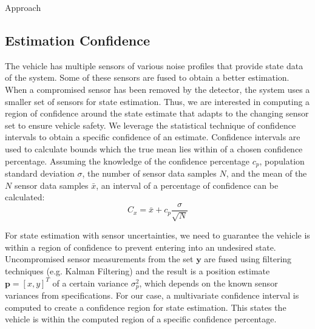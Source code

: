 \begin{section}{Approach}
\subsection{Estimation Confidence}

The vehicle has multiple sensors of various noise profiles that provide state data of the system. Some of these sensors are fused to obtain a better estimation. When a compromised sensor has been removed by the detector, the system uses a smaller set of sensors for state estimation. Thus, we are interested in computing a region of confidence around the state estimate that adapts to the changing sensor set to ensure vehicle safety. We leverage the statistical technique of confidence intervals \cite{devore2011probability} to obtain a specific confidence of an estimate. Confidence intervals are used to calculate bounds which the true mean lies within of a chosen confidence percentage. Assuming the knowledge of the confidence percentage $c_p$, population standard deviation $\sigma$, the number of sensor data samples $N$, and the mean of the $N$ sensor data samples $\bar{x}$, an interval of a percentage of confidence can be calculated:
    \begin{equation}
     \label{Confidence_interval}
		C_x = \bar{x} + c_p\frac{\sigma}{\sqrt{N}}
	\end{equation}
	
	
For state estimation with sensor uncertainties, we need to guarantee the vehicle is within a region of confidence to prevent entering into an undesired state. Uncompromised sensor measurements from the set $\bm{y}$ are fused using filtering techniques (e.g. Kalman Filtering) and the result is a position estimate $\bm{p}=[x,y]^T$ of a certain variance $\sigma_p^2$, which depends on the known sensor variances from specifications. For our case, a multivariate confidence interval is computed to create a confidence region for state estimation. This states the vehicle is within the computed region of a specific confidence percentage.



\end{section}
